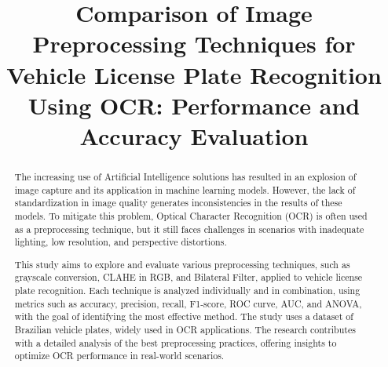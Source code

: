 \documentclass[conference]{IEEEtran}
\begin{document}
    
    \title{Comparison of Image Preprocessing Techniques for Vehicle License Plate Recognition Using OCR: Performance and Accuracy Evaluation}
    
    \author{
        
        \and
        }
    
    \maketitle
    
    \begin{abstract}
        The increasing use of Artificial Intelligence solutions has resulted in an explosion of image capture and its application in machine learning models. However, the lack of standardization in image quality generates inconsistencies in the results of these models. To mitigate this problem, Optical Character Recognition (OCR) is often used as a preprocessing technique, but it still faces challenges in scenarios with inadequate lighting, low resolution, and perspective distortions.
        
        This study aims to explore and evaluate various preprocessing techniques, such as grayscale conversion, CLAHE in RGB, and Bilateral Filter, applied to vehicle license plate recognition. Each technique is analyzed individually and in combination, using metrics such as accuracy, precision, recall, F1-score, ROC curve, AUC, and ANOVA, with the goal of identifying the most effective method. The study uses a dataset of Brazilian vehicle plates, widely used in OCR applications. The research contributes with a detailed analysis of the best preprocessing practices, offering insights to optimize OCR performance in real-world scenarios.
    \end{abstract}
    
\end{document}
